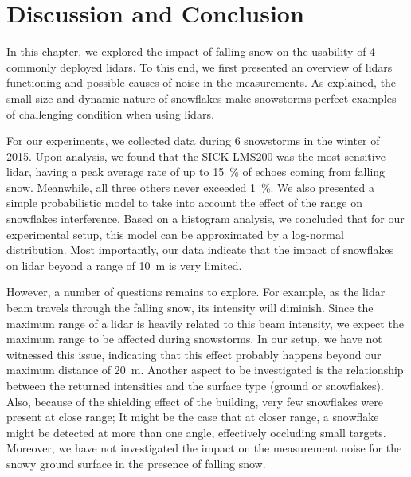 \section{Discussion and Conclusion}
\label{sec:chap_lidar_conclu}

In this chapter, we explored the impact of falling snow on the usability of 4 commonly deployed \gls*{lidar}s. To this end, we first presented an overview of \gls*{lidar}s functioning and possible causes of noise in the measurements. As explained, the small size and dynamic nature of snowflakes make snowstorms perfect examples of challenging condition when using \gls*{lidar}s.

For our experiments, we collected data during 6 snowstorms in the winter of 2015. Upon analysis, we found that the SICK LMS200 was the most sensitive \gls*{lidar}, having a peak average rate of up to \SI{15}{\percent} of echoes coming from falling snow. Meanwhile, all three others never exceeded \SI{1}{\percent}. We also presented a simple probabilistic model to take into account the effect of the range on snowflakes interference. Based on a histogram analysis, we concluded that for our experimental setup, this model can be approximated by a log-normal distribution. Most importantly, our data indicate that the impact of snowflakes on \gls*{lidar} beyond a range of \SI{10}{\meter} is very limited. 

However, a number of questions remains to explore. For example, as the \gls*{lidar} beam travels through the falling snow, its intensity will diminish. Since the maximum range of a \gls*{lidar} is heavily related to this beam intensity, we expect the maximum range to be affected during snowstorms. In our setup, we have not witnessed this issue, indicating that this effect probably happens beyond our maximum distance of \SI{20}{\meter}. Another aspect to be investigated is the relationship between the returned intensities and the surface type (ground or snowflakes). Also, because of the shielding effect of the building, very few snowflakes were present at close range; It might be the case that at closer range, a snowflake might be detected at more than one angle, effectively occluding small targets. Moreover, we have not investigated the impact on the measurement noise for the snowy ground surface in the presence of falling snow.
